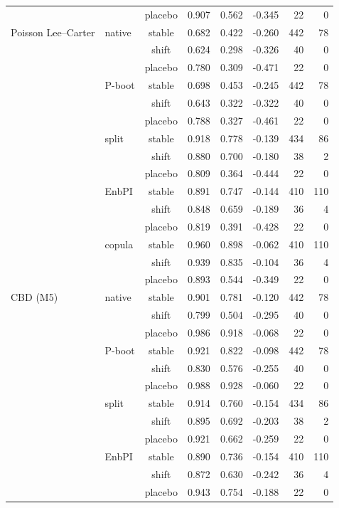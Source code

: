{\begin{longtable}{@{}llcrrrrr@{}}
 &  & placebo & 0.907 & 0.562 & -0.345 & 22 & 0 \\
\addlinespace[2pt]
Poisson Lee--Carter & native & stable & 0.682 & 0.422 & -0.260 & 442 & 78 \\
 &  & shift & 0.624 & 0.298 & -0.326 & 40 & 0 \\
 &  & placebo & 0.780 & 0.309 & -0.471 & 22 & 0 \\
 & P-boot & stable & 0.698 & 0.453 & -0.245 & 442 & 78 \\
 &  & shift & 0.643 & 0.322 & -0.322 & 40 & 0 \\
 &  & placebo & 0.788 & 0.327 & -0.461 & 22 & 0 \\
 & split & stable & 0.918 & 0.778 & -0.139 & 434 & 86 \\
 &  & shift & 0.880 & 0.700 & -0.180 & 38 & 2 \\
 &  & placebo & 0.809 & 0.364 & -0.444 & 22 & 0 \\
 & EnbPI & stable & 0.891 & 0.747 & -0.144 & 410 & 110 \\
 &  & shift & 0.848 & 0.659 & -0.189 & 36 & 4 \\
 &  & placebo & 0.819 & 0.391 & -0.428 & 22 & 0 \\
 & copula & stable & 0.960 & 0.898 & -0.062 & 410 & 110 \\
 &  & shift & 0.939 & 0.835 & -0.104 & 36 & 4 \\
 &  & placebo & 0.893 & 0.544 & -0.349 & 22 & 0 \\
\addlinespace[2pt]
CBD (M5) & native & stable & 0.901 & 0.781 & -0.120 & 442 & 78 \\
 &  & shift & 0.799 & 0.504 & -0.295 & 40 & 0 \\
 &  & placebo & 0.986 & 0.918 & -0.068 & 22 & 0 \\
 & P-boot & stable & 0.921 & 0.822 & -0.098 & 442 & 78 \\
 &  & shift & 0.830 & 0.576 & -0.255 & 40 & 0 \\
 &  & placebo & 0.988 & 0.928 & -0.060 & 22 & 0 \\
 & split & stable & 0.914 & 0.760 & -0.154 & 434 & 86 \\
 &  & shift & 0.895 & 0.692 & -0.203 & 38 & 2 \\
 &  & placebo & 0.921 & 0.662 & -0.259 & 22 & 0 \\
 & EnbPI & stable & 0.890 & 0.736 & -0.154 & 410 & 110 \\
 &  & shift & 0.872 & 0.630 & -0.242 & 36 & 4 \\
 &  & placebo & 0.943 & 0.754 & -0.188 & 22 & 0 \\

\end{longtable}}
